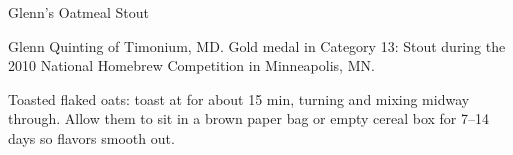 \begin{recipe}{Glenn's Oatmeal Stout}

\begin{aboutblock}
Glenn Quinting of Timonium, MD. Gold medal in Category 13: Stout during the
2010 National Homebrew Competition in Minneapolis, MN. \sourceaha
\end{aboutblock}


\begin{methodandtiming}

\begin{mashsteps}
\end{mashsteps}

\begin{fermentationsteps}
\end{fermentationsteps}

\begin{directions}
Toasted flaked oats: toast at  for about 15 min, turning and mixing
midway through. Allow them to sit in a brown paper bag or empty cereal box
for 7--14 days so flavors smooth out. 
\end{directions}

\end{methodandtiming}

\recipebreak

\begin{ingredientsblock}

\begin{malts}
\end{malts}

\begin{hops}
\end{hops}


\end{ingredientsblock}

\end{recipe}

